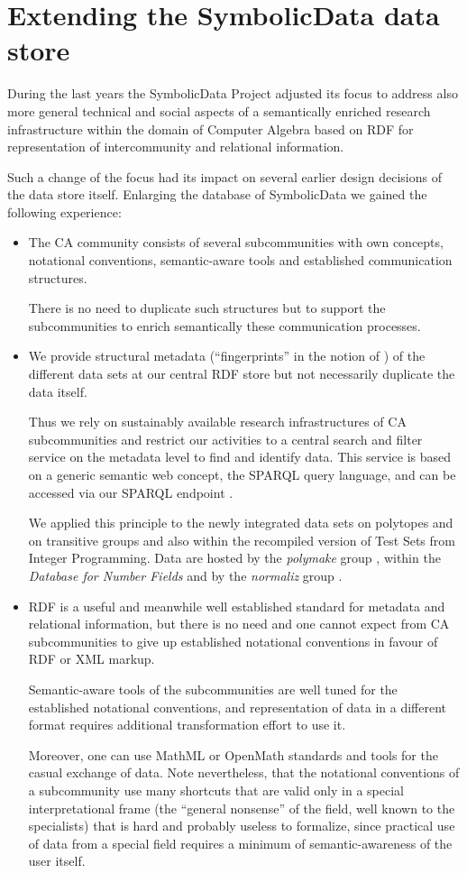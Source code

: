 \documentclass{llncs}
\newcommand{\SD}{{\sc Symbo\-lic\-Data}}
\begin{document}
\section{Extending the {\SD} data store}

During the last years the {\SD} Project adjusted its focus to address also
more general technical and social aspects of a semantically enriched research
infrastructure within the domain of Computer Algebra based on RDF for
representation of intercommunity and relational information.

Such a change of the focus had its impact on several earlier design decisions
of the data store itself. Enlarging the database of {\SD} we gained the
following experience:
\begin{itemize}
\item The CA community consists of several subcommunities with own concepts,
  notational conventions, semantic-aware tools and established communication
  structures.  

  There is no need to duplicate such structures but to support the
  subcommunities to enrich semantically these communication processes.
\item We provide structural metadata (``fingerprints'' in the notion of
  \cite{cicm-14}) of the different data sets at our central RDF store
  \cite{sdstore} but not necessarily duplicate the data itself. 

  Thus we rely on sustainably available research infrastructures of CA
  subcommunities and restrict our activities to a central search and filter
  service on the metadata level to find and identify data. This service is
  based on a generic semantic web concept, the SPARQL query language, and can
  be accessed via our SPARQL endpoint \cite{sdsparql}.

  We applied this principle to the newly integrated data sets on polytopes and
  on transitive groups and also within the recompiled version of Test Sets from
  Integer Programming.  Data are hosted by the \emph{polymake} group
  \cite{polymake}, within the \emph{Database for Number Fields}
  \cite{MalleKlueners} and by the \emph{normaliz} group \cite{normaliz}.
\item RDF is a useful and meanwhile well established standard for metadata and
  relational information, but there is no need and one cannot expect from CA
  subcommunities to give up established notational conventions in favour of
  RDF or XML markup. 

  Semantic-aware tools of the subcommunities are well tuned for the
  established notational conventions, and representation of data in a different
  format requires additional transformation effort to use it.

  Moreover, one can use MathML or OpenMath standards and tools for the casual
  exchange of data. Note nevertheless, that the notational conventions of a
  subcommunity use many shortcuts that are valid only in a special
  interpretational frame (the ``general nonsense'' of the field, well known to
  the specialists) that is hard and probably useless to formalize, since
  practical use of data from a special field requires a minimum of
  semantic-awareness of the user itself.
\end{itemize}
\end{document}

